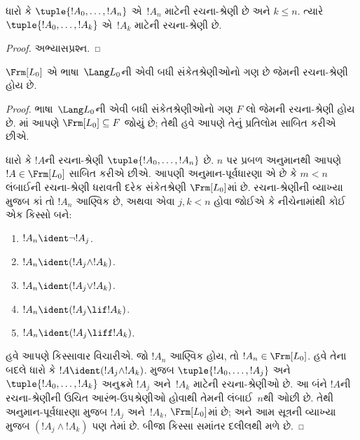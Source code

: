 \begin{lem}
ધારો કે $\tuple{!A_0,\dotsc,!A_n}$ એ~$!A_n$ માટેની રચના-શ્રેણી છે
અને $k\leq n$. ત્યારે $\tuple{!A_0,\dotsc,!A_k}$ એ~$!A_k$ માટેની
રચના-શ્રેણી છે.
\end{lem}

\begin{proof}
અભ્યાસપ્રશ્ન.
\end{proof}

\begin{thm}
$\Frm[L_0]$ એ ભાષા~$\Lang L_0$ની એવી બધી સંકેતશ્રેણીઓનો ગણ છે
જેમની રચના-શ્રેણી હોય છે.
\end{thm}

\begin{proof}
ભાષા~$\Lang L_0$ની એવી બધી સંકેતશ્રેણીઓનો ગણ $F$ લો જેમની
રચના-શ્રેણી હોય છે. માં આપણે
$\Frm[L_0]\subseteq F$ જોયું છે; તેથી હવે આપણે તેનું પ્રતિલોમ
સાબિત કરીએ છીએ.

ધારો કે $!A$ની રચના-શ્રેણી $\tuple{!A_0,\dotsc,!A_n}$ છે. $n$ પર
પ્રબળ અનુમાનથી આપણે $!A\in\Frm[L_0]$ સાબિત કરીએ છીએ. આપણી
અનુમાન-પૂર્વધારણા એ છે કે $m<n$ લંબાઈની રચના-શ્રેણી ધરાવતી દરેક
સંકેતશ્રેણી $\Frm[L_0]$માં છે. રચના-શ્રેણીની વ્યાખ્યા મુજબ કાં તો
$!A_n$ આણ્વિક છે, અથવા એવા $j,k<n$ હોવા જોઈએ કે નીચેનામાંથી કોઈ એક
કિસ્સો બને:
\begin{enumerate}
    \item $!A_n \ident \lnot !A_j$.%
    \item $!A_n \ident (!A_j \land !A_k)$.%
    \item $!A_n \ident (!A_j \lor !A_k)$.%
    \item $!A_n \ident (!A_j \lif !A_k)$.%
    \item $!A_n \ident (!A_j \liff !A_k)$.%
\end{enumerate}
હવે આપણે કિસ્સાવાર વિચારીએ. જો $!A_n$ આણ્વિક હોય, તો
$!A_n\in\Frm[L_0]$. હવે તેના બદલે ધારો કે $!A\ident
(!A_j\land !A_k)$.  મુજબ
$\tuple{!A_0,\dotsc,!A_j}$ અને $\tuple{!A_0,\dotsc,!A_k}$ અનુક્રમે
$!A_j$ અને~$!A_k$ માટેની રચના-શ્રેણીઓ છે. આ બંને $!A$ની
રચના-શ્રેણીની ઉચિત આરંભ-ઉપશ્રેણીઓ હોવાથી તેમની લંબાઈ~$n$થી ઓછી છે.
તેથી અનુમાન-પૂર્વધારણા મુજબ $!A_j$ અને~$!A_k$, $\Frm[L_0]$માં છે;
અને આમ સૂત્રની વ્યાખ્યા મુજબ $(!A_j\land !A_k)$ પણ તેમાં છે.
બીજા કિસ્સા સમાંતર દલીલથી મળે છે.
\end{proof}
\endgroup


